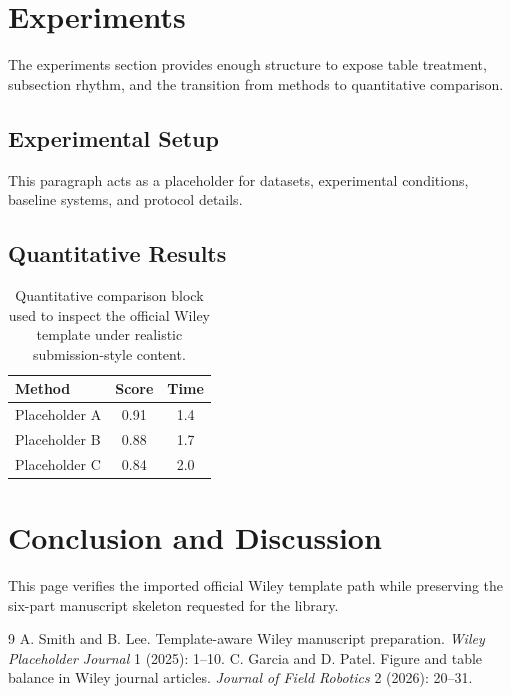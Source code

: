 \documentclass[MPS,twocolumn]{USG}
\begin{document}
\section{Experiments}
The experiments section provides enough structure to expose table treatment, subsection rhythm, and the transition from methods to quantitative comparison.
\subsection{Experimental Setup}
This paragraph acts as a placeholder for datasets, experimental conditions, baseline systems, and protocol details.
\subsection{Quantitative Results}
\begin{table}[htb]
\caption{Quantitative comparison block used to inspect the official Wiley template under realistic submission-style content.}
\begin{tabular}{lcc}
\toprule
Method & Score & Time \\
\midrule
Placeholder A & 0.91 & 1.4 \\
Placeholder B & 0.88 & 1.7 \\
Placeholder C & 0.84 & 2.0 \\
\bottomrule
\end{tabular}
\end{table}
\section{Conclusion and Discussion}
This page verifies the imported official Wiley template path while preserving the six-part manuscript skeleton requested for the library.
\begin{thebibliography}{9}
 A. Smith and B. Lee. Template-aware Wiley manuscript preparation. \textit{Wiley Placeholder Journal} 1 (2025): 1--10.
 C. Garcia and D. Patel. Figure and table balance in Wiley journal articles. \textit{Journal of Field Robotics} 2 (2026): 20--31.
\end{thebibliography}
\end{document}
